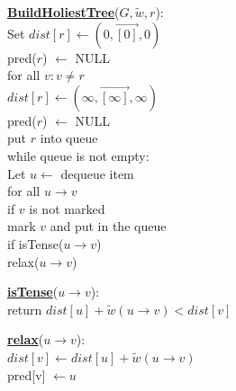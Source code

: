 \documentclass{article}
\begin{document}
\begin{minipage}[t]{0.48\linewidth}
\begin{algorithm}
\textbf{\underline{BuildHoliestTree}}($G, \tilde w , r$): \\ \quad
Set $dist[r] \leftarrow ( 0, \vec{[0]}, 0 )$ \\ \quad \quad
    pred($r$) $\leftarrow$ NULL \\ \quad
for all $v : v \neq r$ \\ \quad \quad
    $dist[r] \leftarrow ( \infty, \vec{[\infty]}, \infty )$ \\ \quad \quad
    pred($r$) $\leftarrow$ NULL \\ \quad
put $r$ into queue \\ \quad
while queue is not empty: \\ \quad \quad
    Let $u \leftarrow$ dequeue item \\ \quad \quad
    for all $u \rightarrow v$ \\ \qquad \quad
        if $v$ is not marked \\ \quad \qquad \quad
           mark $v$ and put in the queue \\ \qquad \quad
        if isTense($u \rightarrow v$) \\ \quad \qquad \quad
           relax($u \rightarrow v$)
\end{algorithm}
\end{minipage}
\hfill%
\hspace{-4cm}
\begin{minipage}[t]{0.48\linewidth}
\begin{algorithm}
\textbf{\underline{isTense}}($u \rightarrow v$): \\ \quad
return $dist[u] + \tilde w(u \rightarrow v) < dist[v]$ \\

\end{algorithm}

\vspace{0.5cm}

\begin{algorithm}
\textbf{\underline{relax}}($u \rightarrow v$): \\ \quad
$dist[v] \leftarrow dist[u] + \tilde w(u \rightarrow v)$ \\ \quad
pred[v] $\leftarrow u$ \\
\end{algorithm}
\end{minipage}

\vspace{0.5cm}
\end{document}
